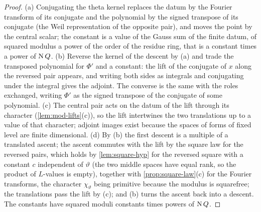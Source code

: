 \begin{proof}
(a) Conjugating the theta kernel replaces the datum by the Fourier transform of its conjugate and the polynomial by the signed transpose of its conjugate (the Weil representation of the opposite pair), and moves
the point by the central scalar; the constant is a value of the Gauss sum of the finite datum, of squared modulus a power of the order of the residue ring, that is a constant times a power of $\operatorname{N} Q$.
(b) Reverse the kernel of the descent by (a) and trade the transposed polynomial for $\Phi'$ and a constant: the lift of the conjugate of $x$ along the reversed pair appears, and writing both sides as integrals and
conjugating under the integral gives the adjoint. The converse is the same with the roles exchanged, writing $\Phi'$ as the signed transpose of the conjugate of some polynomial. (c) The central pair acts on
the datum of the lift through its character (\cref{lem:mod-lifts}(c)), so the lift intertwines the two translations up to a value of that character; adjoint images exist because the spaces of forms of fixed
level are finite dimensional. (d) By (b) the first descent is a multiple of a translated ascent; the ascent commutes with the lift by the square law for the reversed pairs, which holds by \cref{lem:square-hyp}
for the reversed square with a constant $c$ independent of $\vartheta$ (the two middle spaces have equal rank, so the product of $L$-values is empty), together with \cref{prop:square-law}(c) for the Fourier
transforms, the character $\chi_\vartheta$ being primitive because the modulus is squarefree; the translations pass the lift by (c); and (b) turns the ascent back into a descent. The constants have squared moduli
constants times powers of $\operatorname{N} Q$.
\end{proof}

